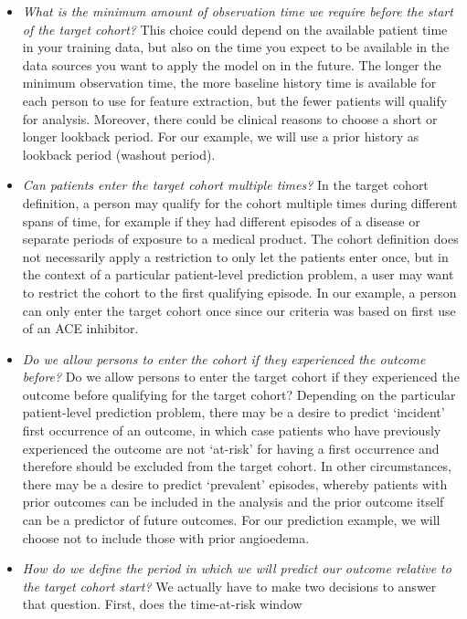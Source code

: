 \documentclass[11pt]{book}
\begin{document}
\begin{itemize}
\item
  \emph{What is the minimum amount of observation time we require before
  the start of the target cohort?} This choice could depend on the
  available patient time in your training data, but also on the time you
  expect to be available in the data sources you want to apply the model
  on in the future. The longer the minimum observation time, the more
  baseline history time is available for each person to use for feature
  extraction, but the fewer patients will qualify for analysis.
  Moreover, there could be clinical reasons to choose a short or longer
  lookback period. For our example, we will use a prior history as
  lookback period (washout period).
\item
  \emph{Can patients enter the target cohort multiple times?} In the
  target cohort definition, a person may qualify for the cohort multiple
  times during different spans of time, for example if they had
  different episodes of a disease or separate periods of exposure to a
  medical product. The cohort definition does not necessarily apply a
  restriction to only let the patients enter once, but in the context of
  a particular patient-level prediction problem, a user may want to
  restrict the cohort to the first qualifying episode. In our example, a
  person can only enter the target cohort once since our criteria was
  based on first use of an ACE inhibitor.
\item
  \emph{Do we allow persons to enter the cohort if they experienced the
  outcome before?} Do we allow persons to enter the target cohort if
  they experienced the outcome before qualifying for the target cohort?
  Depending on the particular patient-level prediction problem, there
  may be a desire to predict `incident' first occurrence of an outcome,
  in which case patients who have previously experienced the outcome are
  not `at-risk' for having a first occurrence and therefore should be
  excluded from the target cohort. In other circumstances, there may be
  a desire to predict `prevalent' episodes, whereby patients with prior
  outcomes can be included in the analysis and the prior outcome itself
  can be a predictor of future outcomes. For our prediction example, we
  will choose not to include those with prior angioedema.
\item
  \emph{How do we define the period in which we will predict our outcome
  relative to the target cohort start?} We actually have to make two
  decisions to answer that question. First, does the time-at-risk window

\end{itemize}
\end{document}
